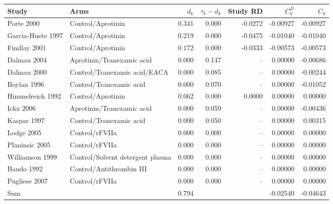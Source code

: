 \begin{tabular}{llrrrrr}
\toprule
Study & Arms & $d_k$ & $\tau_k-d_k$ & Study RD & $C^D_k$ & $C_k$ \\
\midrule
Porte 2000 & Control/Aprotinin & 0.341 & 0.000 & -0.0272 & -0.00927 & -0.00927 \\
Garcia-Huete 1997 & Control/Aprotinin & 0.219 & 0.000 & -0.0475 & -0.01040 & -0.01040 \\
Findlay 2001 & Control/Aprotinin & 0.172 & 0.000 & -0.0333 & -0.00573 & -0.00573 \\
Dalmau 2004 & Aprotinin/Tranexamic acid & 0.000 & 0.147 & -- & 0.00000 & -0.00686 \\
Dalmau 2000 & Control/Tranexamic acid/EACA & 0.000 & 0.085 & -- & 0.00000 & -0.00244 \\
Boylan 1996 & Control/Tranexamic acid & 0.000 & 0.070 & -- & 0.00000 & -0.01052 \\
Himmelreich 1992 & Control/Aprotinin & 0.062 & 0.000 & 0.0000 & 0.00000 & 0.00000 \\
Ickx 2006 & Aprotinin/Tranexamic acid & 0.000 & 0.059 & -- & 0.00000 & -0.00436 \\
Kaspar 1997 & Control/Tranexamic acid & 0.000 & 0.050 & -- & 0.00000 & 0.00315 \\
Lodge 2005 & Control/rFVIIa & 0.000 & 0.000 & -- & 0.00000 & 0.00000 \\
Planinsic 2005 & Control/rFVIIa & 0.000 & 0.000 & -- & 0.00000 & 0.00000 \\
Williamson 1999 & Control/Solvent detergent plasma & 0.000 & 0.000 & -- & 0.00000 & 0.00000 \\
Baudo 1992 & Control/Antithrombin III & 0.000 & 0.000 & -- & 0.00000 & 0.00000 \\
Pugliese 2007 & Control/rFVIIa & 0.000 & 0.000 & -- & 0.00000 & 0.00000 \\
\midrule
Sum & & 0.794 & & & -0.02540 & -0.04643 \\
\bottomrule
\end{tabular}
